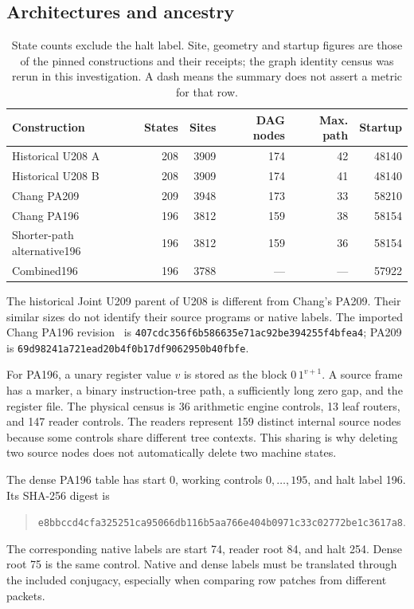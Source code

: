 \documentclass[11pt,a4paper]{article}
\newcommand{\file}[1]{\texttt{\nolinkurl{#1}}}
\begin{document}
\subsection{Architectures and ancestry}

\begin{table}[htbp]
\centering\small
\begin{tabular}{@{}lrrrrr@{}}
\toprule
Construction & States & Sites & DAG nodes & Max. path & Startup\\
\midrule
Historical U208 A & 208 & 3909 & 174 & 42 & 48140\\
Historical U208 B & 208 & 3909 & 174 & 41 & 48140\\
Chang PA209 & 209 & 3948 & 173 & 33 & 58210\\
Chang PA196 & 196 & 3812 & 159 & 38 & 58154\\
Shorter-path alternative196 & 196 & 3812 & 159 & 36 & 58154\\
Combined196 & 196 & 3788 & --- & --- & 57922\\
\bottomrule
\end{tabular}
\caption{State counts exclude the halt label. Site, geometry and startup
figures are those of the pinned constructions and their receipts; the graph
identity census was rerun in this investigation. A dash means the summary
does not assert a metric for that row.}
\end{table}

The historical Joint U209 parent of U208 is different from Chang's PA209.
Their similar sizes do not identify their source programs or native labels.
The imported Chang PA196 revision~\cite{chang} is
\file{407cdc356f6b586635e71ac92be394255f4bfea4}; PA209 is
\file{69d98241a721ead20b4f0b17df9062950b40fbfe}.

For PA196, a unary register value $v$ is stored as the block $0\,1^{v+1}$.
A source frame has a marker, a binary instruction-tree path, a sufficiently
long zero gap, and the register file. The physical census is 36 arithmetic
engine controls, 13 leaf routers, and 147 reader controls. The readers
represent 159 distinct internal source nodes because some controls share
different tree contexts. This sharing is why deleting two source nodes
does not automatically delete two machine states.

The dense PA196 table has start 0, working controls $0,\ldots,195$, and
halt label 196. Its SHA-256 digest is
\begin{quote}\small
\nolinkurl{e8bbccd4cfa325251ca95066db116b5aa766e404b0971c33c02772be1c3617a8}.
\end{quote}
The corresponding native labels are start 74, reader root 84, and halt
254. Dense root 75 is the same control. Native and dense labels must be
translated through the included conjugacy, especially when comparing row
patches from different packets.
\end{document}
